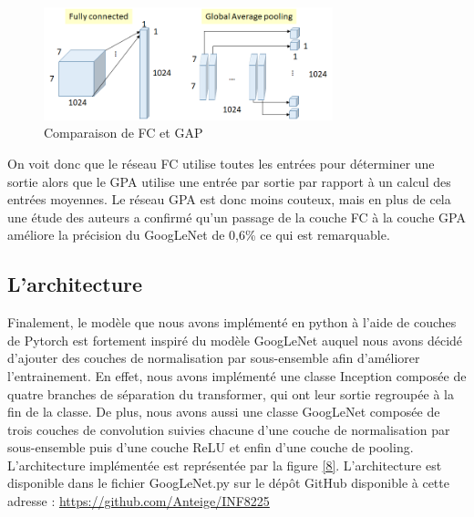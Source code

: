 \documentclass{article}
\begin{document}
\begin{figure}[htbp]
    \includegraphics[width=8.4cm]{./figures/Figure4.png} 
    \caption{Comparaison de FC et GAP}
    \label{7} 
\end{figure} 

On voit donc que le réseau FC utilise toutes les entrées pour déterminer une
sortie alors que le GPA utilise une entrée par sortie par rapport à un calcul 
des entrées moyennes. Le réseau GPA est donc moins couteux, mais en plus de cela
une étude des auteurs a confirmé qu'un passage de la couche FC à la couche GPA
améliore la précision du GoogLeNet de 0,6\% ce qui est remarquable.

\subsection{L'architecture}
Finalement, le modèle que nous avons implémenté en python à l’aide de couches de
Pytorch est fortement inspiré du modèle GoogLeNet auquel nous avons décidé
d’ajouter des couches de normalisation par sous-ensemble afin d’améliorer 
l’entrainement. En effet, nous avons implémenté une classe Inception composée de
quatre branches de séparation du transformer, qui ont leur sortie regroupée à la
fin de la classe. De plus, nous avons aussi une classe GoogLeNet composée de 
trois couches de convolution suivies chacune d'une couche de normalisation par
sous-ensemble puis d’une couche ReLU et enfin d’une couche de pooling.
L'architecture implémentée est représentée par la figure \ref{8}. L'architecture
est disponible dans le fichier GoogLeNet.py sur le dépôt GitHub disponible
à cette adresse : \url{https://github.com/Anteige/INF8225}
\end{document}
